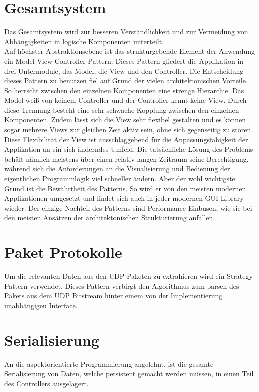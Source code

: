
\section{Gesamtsystem}
\label{sec:7:global}

Das Gesamtsystem wird zur besseren Verständlichkeit und zur Vermeidung von Abhängigkeiten 
in logische Komponenten unterteilt. \\
Auf höchster Abstraktionsebene ist das strukturgebende Element der Anwendung ein Model-View-Controller Pattern.
Dieses Pattern gliedert die Applikation in drei Untermodule, das Model, die View und den Controller.
Die Entscheidung dieses Pattern zu benutzen fiel auf Grund der vielen architektonischen Vorteile.
So herrscht zwischen den einzelnen Komponenten eine strenge Hierarchie. Das Model weiß von keinem Controller und
der Controller kennt keine View. Durch diese Trennung besteht eine sehr schwache Kopplung zwischen den einzelnen
Komponenten. Zudem lässt sich die View sehr flexibel gestalten und es können sogar mehrere Views zur gleichen
Zeit aktiv sein, ohne sich gegenseitig zu stören. Diese Flexibilität der View ist ausschlaggebend für 
die Anpassungsfähigkeit der Applikation an ein sich änderndes Umfeld. Die tatsächliche Lösung des Problems 
behält nämlich meistens über einen relativ langen Zeitraum seine Berechtigung, während sich die Anforderungen
an die Visualisierung und Bedienung der eigentlichen Programmlogik viel schneller ändern. 
Aber der wohl wichtigste Grund ist die Bewährtheit des Patterns. So wird er von den meisten modernen Applikationen
umgesetzt und findet sich auch in jeder modernen GUI Library wieder. Der einzige Nachteil des Patterns sind
Performance Einbusen, wie sie bei den meisten Ansätzen der architektonischen Strukturierung anfallen.

\section{Paket Protokolle}
\label{sec:7:packet}
Um die relevanten Daten aus den UDP Paketen zu extrahieren wird ein Strategy Pattern verwendet.
Dieses Pattern verbirgt den Algorithmus zum parsen des Pakets aus dem UDP Bitstream hinter einem von der
Implementierung unabhängigen Interface.

\section{Serialisierung}
\label{sec:7:serial}
An die aspektorientierte Programmierung angelehnt, ist die gesamte
Serialisierung von Daten, welche persistent gemacht werden müssen, in einen Teil des Controllers ausgelagert.

